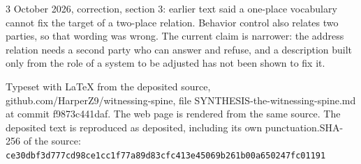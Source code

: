 \documentclass[11pt]{article}
\begin{document}
3 October 2026, correction, section 3: earlier text said a one-place vocabulary cannot fix the target of a two-place relation. Behavior control also relates two parties, so that wording was wrong. The current claim is narrower: the address relation needs a second party who can answer and refuse, and a description built only from the role of a system to be adjusted has not been shown to fix it.

\vfill{\footnotesize Typeset with LaTeX from the deposited source, github.com/HarperZ9/witnessing-spine, file SYNTHESIS-the-witnessing-spine.md at commit f9873c441daf. The web page is rendered from the same source. The deposited text is reproduced as deposited, including its own punctuation.\newline SHA-256 of the source: \texttt{ce30dbf3d777cd98ce1cc1f77a89d83cfc413e45069b261b00a650247fc01191}\par}
\end{document}
